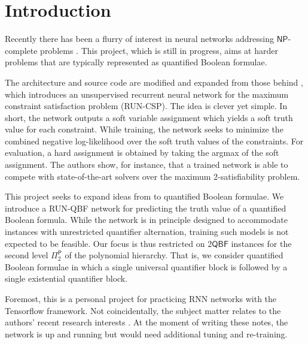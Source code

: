 \documentclass[12pt]{article}
\newcommand*{\NP}{\mathsf{NP}}
\newcommand*{\PTIME}{\mathsf{P}}
\newcommand*{\QBF}{\mathsf{QBF}}
\newcommand*{\RUNCSP}{\textrm{RUN-CSP}\xspace}
\newcommand*{\RUNQBF}{\textrm{RUN-QBF}\xspace}
\begin{document}
\maketitle

\section{Introduction}
Recently there has been a flurry of interest in neural networks addressing $\NP$-complete problems \cite{AmizadehMW19,LemosPAL19,PratesALLV19,SelsamLBLMD19,TonshoffRWG20}. This project, which is still in progress, aims at harder problems that are typically represented as quantified Boolean formulae.

The architecture and source code are modified and expanded from those behind \cite{TonshoffRWG20}, which introduces an unsupervised recurrent neural network for the maximum constraint satisfaction problem (\RUNCSP). The idea is clever yet simple. In short, the network outputs a soft variable assignment which  yields a soft truth value for each constraint. While training, the network seeks to minimize the combined negative log-likelihood over the soft truth values of the constraints. For evaluation, a hard assignment is obtained by taking the argmax of the soft assignment. The authors show, for instance, that a trained network is able to compete with state-of-the-art solvers over the maximum 2-satisfiability problem.

This project seeks to expand ideas from \cite{TonshoffRWG20} to quantified Boolean formulae. We introduce a \RUNQBF network for predicting the truth value of a quantified Boolean formula. While the network is in principle designed to accommodate instances with unrestricted quantifier alternation, training such models is not expected to be feasible. Our focus is thus restricted on 2$\QBF$ instances for the second level $\Pi^\PTIME_2$ of the polynomial hierarchy.  That is, we consider quantified Boolean formulae in which a single universal quantifier block is followed by a single existential quantifier block. 

Foremost, this is a personal project for practicing RNN networks with the Tensorflow framework. Not coincidentally, the subject matter relates  to the authors' recent research interests \cite{HannulaKLV21}. At the moment of writing these notes, the network is up and running but would need additional tuning and re-training.
\end{document}
